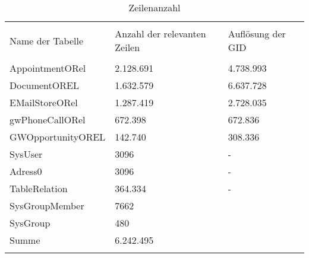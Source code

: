 \begin{table}[htbp]
\centering
\label{tb_zeilenanzahl}
\begin{tabularx}{\textwidth} {X X X}
& & \\
Name der Tabelle &  Anzahl der relevanten Zeilen & Auflösung der GID\\
& & \\
AppointmentORel & 2.128.691 & 4.738.993 \\
DocumentOREL & 1.632.579 & 6.637.728 \\
EMailStoreORel & 1.287.419 & 2.728.035 \\
gwPhoneCallORel & 672.398 & 672.836 \\
GWOpportunityOREL & 142.740 & 308.336 \\
SysUser & 3096 & - \\
Adress0 & 3096 & - \\
TableRelation & 364.334 & - \\
SysGroupMember & 7662 & \\
SysGroup & 480 & \\
\midrule
Summe & 6.242.495 \\
& & \\
\end{tabularx}
\caption{Zeilenanzahl}
\end{table}